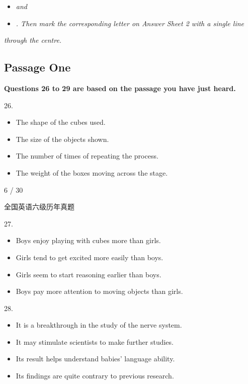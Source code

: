 \documentclass[UTF8,11pt]{ctexart}
\begin{document}
\begin{itemize}[leftmargin=2em,itemsep=.2em,topsep=.4em]\item[C.] \textit{and}
\item[D.] \textit{. Then mark the corresponding letter on Answer Sheet 2 with a single line}
\end{itemize}

\textit{through the centre.}


\subsection*{\textbf{Passage One}}


\textbf{Questions 26 to 29 are based on the passage you have just heard.}


26.


\begin{itemize}[leftmargin=2em,itemsep=.2em,topsep=.4em]\item[A.] The shape of the cubes used.
\item[B.] The size of the objects shown.
\item[C.] The number of times of repeating the process.
\item[D.] The weight of the boxes moving across the stage.
\end{itemize}

6 / 30


全国英语六级历年真题


27.


\begin{itemize}[leftmargin=2em,itemsep=.2em,topsep=.4em]\item[A.] Boys enjoy playing with cubes more than girls.
\item[B.] Girls tend to get excited more easily than boys.
\item[C.] Girls seem to start reasoning earlier than boys.
\item[D.] Boys pay more attention to moving objects than girls.
\end{itemize}

28.


\begin{itemize}[leftmargin=2em,itemsep=.2em,topsep=.4em]\item[A.] It is a breakthrough in the study of the nerve system.
\item[B.] It may stimulate scientists to make further studies.
\item[C.] Its result helps understand babies' language ability.
\item[D.] Its findings are quite contrary to previous research.
\end{itemize}
\end{document}
